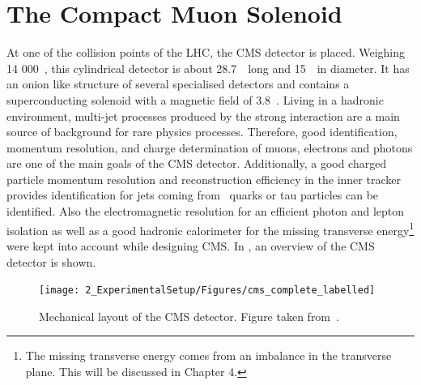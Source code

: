 \section{The Compact Muon Solenoid}
\label{sec:CMS}
At one of the collision points of the LHC, the CMS detector\cite{CMS, Bayatian:2006zz,Bayatian:922757} is placed. Weighing 14 000~\tonne, this cylindrical detector is about 28.7~\meter\ long and 15~\meter\ in diameter. It has an onion like structure of several specialised detectors and contains a superconducting solenoid with a magnetic field of 3.8~\Tesla. Living in a hadronic environment, multi-jet processes produced by the strong interaction are a main source of background for rare physics processes. Therefore, good identification, momentum resolution, and charge determination of muons, electrons and photons are one of the main goals of the CMS detector. Additionally, a good charged particle momentum resolution and reconstruction efficiency in the inner tracker provides identification for jets coming from \Pbottom\ quarks or tau particles can be identified. Also the electromagnetic resolution for an efficient photon and lepton isolation as well as a good hadronic calorimeter for the missing transverse energy\footnote{The missing transverse energy comes from an imbalance in the transverse plane. This will be discussed in Chapter 4.} were kept into account while designing CMS. In , an overview of the CMS detector is shown. 
\begin{figure}[htbp]
	\centering
	\texttt{[image: 2\_ExperimentalSetup/Figures/cms\_complete\_labelled]}
	\caption{Mechanical layout of the CMS detector. Figure taken from~\cite{CMSdraw}.}
	\label{fig:CMS}
\end{figure}

